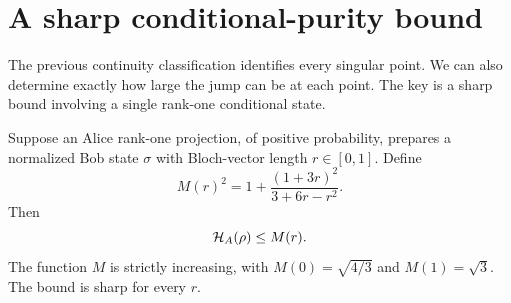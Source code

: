 \section{A sharp conditional-purity bound}
\label{sec:conditional}

The previous continuity classification identifies every singular point.
We can also determine exactly how large the jump can be at each point.
The key is a sharp bound involving a single rank-one conditional state.

\begin{theorem}\label{thm:conditional}
Suppose an Alice rank-one projection, of positive probability, prepares
a normalized Bob state $\sigma$ with Bloch-vector length $r\in[0,1]$.
Define
\begin{equation}\label{eq:conditionalcap}\boxed{
 M(r)^2=1+\frac{(1+3r)^2}{3+6r-r^2}.}
\end{equation}
Then
\begin{equation}\label{eq:conditionalbound}
 \mathcal H_A(\rho)\leq M(r).
\end{equation}
The function $M$ is strictly increasing, with
$M(0)=\sqrt{4/3}$ and $M(1)=\sqrt3$. The bound is sharp for every $r$.
\end{theorem}

